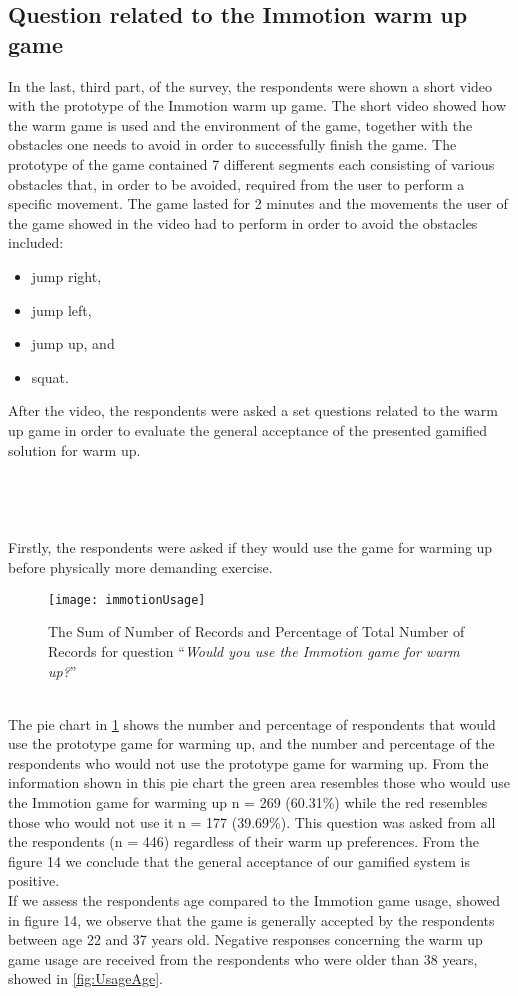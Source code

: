 \subsection{Question related to the Immotion warm up game}
In the last, third part, of the survey, the respondents were shown a short video with the prototype of the Immotion warm up game. The short video showed how the warm game is used and the environment of the game, together with the obstacles one needs to avoid in order to successfully finish the game. The prototype of the game contained 7 different segments each consisting of various obstacles that, in order to be avoided, required from the user to perform a specific movement. The game lasted for 2 minutes and the movements the user of the game showed in the video had to perform in order to avoid the obstacles included: 
\begin{itemize}
\item jump right,
\item jump left,
\item jump up, and
\item squat.
\end{itemize}
After the video, the respondents were asked a set questions related to the warm up game in order to evaluate the general acceptance of the presented gamified solution for warm up.\\\\\\\\\\ Firstly, the respondents were asked if they would use the game for warming up before physically more demanding exercise. \\
\begin{figure}[h]
    \centering
    \texttt{[image: immotionUsage]}
    \caption{The Sum of Number of Records and Percentage of Total Number of Records for question ``\textit{Would you use the Immotion game for warm up?}''}
    \label{fig:immotionUsage}
\end{figure}\\
The pie chart in \ref{fig:immotionUsage} shows the number and percentage of respondents that would use the prototype game for warming up, and the number and percentage of the respondents who would not use the prototype game for warming up. From the information shown in this pie chart the green area resembles those who would use the Immotion game for warming up n = 269 (60.31\%) while the red resembles those who would not use it n = 177 (39.69\%). This question was asked from all the respondents (n = 446) regardless of their warm up preferences. From the figure 14 we conclude that the general acceptance of our gamified system is positive.\\ If we assess the respondents age compared to the Immotion game usage, showed in figure 14, we observe that the game is generally accepted by the respondents between age 22 and 37 years old. Negative responses concerning the warm up game usage are received from the respondents who were older than 38 years, showed in \ref{fig:UsageAge}.\\ 
